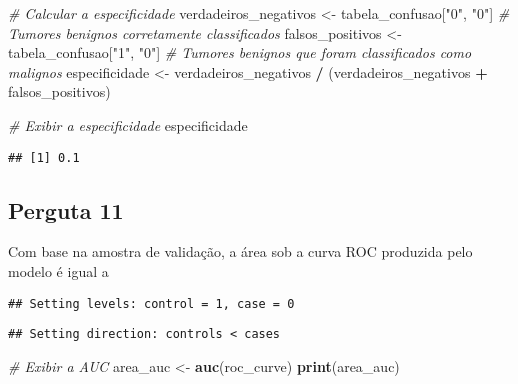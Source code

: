 \documentclass[
]{article}
\newenvironment{Shaded}{\begin{snugshade}}{\end{snugshade}}
\newcommand{\CommentTok}[1]{\textcolor[rgb]{0.56,0.35,0.01}{\textit{#1}}}
\newcommand{\FunctionTok}[1]{\textcolor[rgb]{0.13,0.29,0.53}{\textbf{#1}}}
\newcommand{\NormalTok}[1]{#1}
\newcommand{\OtherTok}[1]{\textcolor[rgb]{0.56,0.35,0.01}{#1}}
\newcommand{\SpecialCharTok}[1]{\textcolor[rgb]{0.81,0.36,0.00}{\textbf{#1}}}
\newcommand{\StringTok}[1]{\textcolor[rgb]{0.31,0.60,0.02}{#1}}
\begin{document}
\begin{Shaded}
\begin{Highlighting}[]
\CommentTok{\# Calcular a especificidade}
\NormalTok{verdadeiros\_negativos }\OtherTok{\textless{}{-}}\NormalTok{ tabela\_confusao[}\StringTok{"0"}\NormalTok{, }\StringTok{"0"}\NormalTok{]  }\CommentTok{\# Tumores benignos corretamente classificados}
\NormalTok{falsos\_positivos }\OtherTok{\textless{}{-}}\NormalTok{ tabela\_confusao[}\StringTok{"1"}\NormalTok{, }\StringTok{"0"}\NormalTok{]       }\CommentTok{\# Tumores benignos que foram classificados como malignos}
\NormalTok{especificidade }\OtherTok{\textless{}{-}}\NormalTok{ verdadeiros\_negativos }\SpecialCharTok{/}\NormalTok{ (verdadeiros\_negativos }\SpecialCharTok{+}\NormalTok{ falsos\_positivos)}

\CommentTok{\# Exibir a especificidade}
\NormalTok{especificidade}
\end{Highlighting}
\end{Shaded}

\begin{verbatim}
## [1] 0.1
\end{verbatim}

\subsection{Perguta 11}\label{perguta-11}

Com base na amostra de validação, a área sob a curva ROC produzida pelo
modelo é igual a

\begin{Shaded}
\end{Shaded}

\begin{verbatim}
## Setting levels: control = 1, case = 0
\end{verbatim}

\begin{verbatim}
## Setting direction: controls < cases
\end{verbatim}

\begin{Shaded}
\begin{Highlighting}[]
\CommentTok{\# Exibir a AUC}
\NormalTok{area\_auc }\OtherTok{\textless{}{-}} \FunctionTok{auc}\NormalTok{(roc\_curve)}
\FunctionTok{print}\NormalTok{(area\_auc)}
\end{Highlighting}
\end{Shaded}
\end{document}
